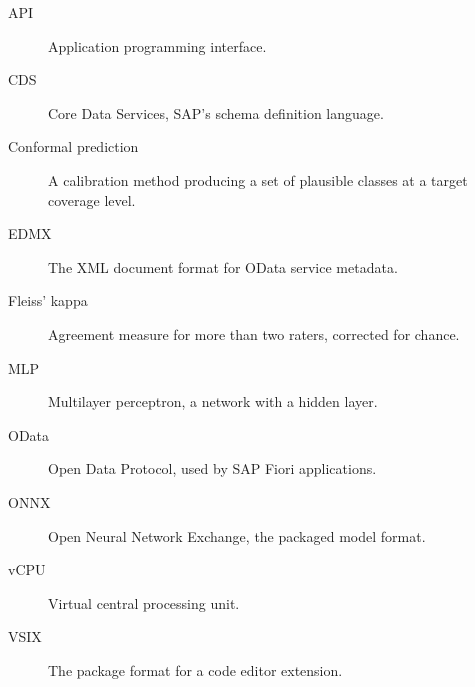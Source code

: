 \documentclass[conference]{IEEEtran}
\begin{document}
\begin{description}
  \item[API] Application programming interface.
  \item[CDS] Core Data Services, SAP's schema definition language.
  \item[Conformal prediction] A calibration method producing a set of
    plausible classes at a target coverage level.
  \item[EDMX] The XML document format for OData service metadata.
  \item[Fleiss' kappa] Agreement measure for more than two raters,
    corrected for chance.
  \item[MLP] Multilayer perceptron, a network with a hidden layer.
  \item[OData] Open Data Protocol, used by SAP Fiori applications.
  \item[ONNX] Open Neural Network Exchange, the packaged model format.
  \item[vCPU] Virtual central processing unit.
  \item[VSIX] The package format for a code editor extension.
\end{description}
\end{document}
